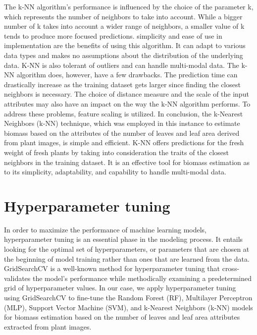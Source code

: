 \documentclass[a4paper,11pt]{report}%
\renewcommand{\\}{\vspace*{0.5\baselineskip} \newline}
\begin{document}
\noindent The k-NN algorithm's performance is influenced by the choice of the parameter k, which represents the number of neighbors to take into account. While a bigger number of k takes into account a wider range of neighbors, a smaller value of k tends to produce more focused predictions. 
simplicity and ease of use in implementation are the benefits of using this algorithm. It can adapt to various data types and makes no assumptions about the distribution of the underlying data. K-NN is also tolerant of outliers and can handle multi-modal data.
The k-NN algorithm does, however, have a few drawbacks. The prediction time can drastically increase as the training dataset gets larger since finding the closest neighbors is necessary. The choice of distance measure and the scale of the input attributes may also have an impact on the way the k-NN algorithm performs. To address these problems, feature scaling is utilized.
In conclusion, the k-Nearest Neighbors (k-NN) technique, which was employed in this instance to estimate biomass based on the attributes of the number of leaves and leaf area derived from plant images, is simple and efficient. K-NN offers predictions for the fresh weight of fresh plants by taking into consideration the traits of the closest neighbors in the training dataset. It is an effective tool for biomass estimation as to its simplicity, adaptability, and capability to handle multi-modal data. 

\section{Hyperparameter tuning}
In order to maximize the performance of machine learning models, hyperparameter tuning is an essential phase in the modeling process. It entails looking for the optimal set of hyperparameters, or parameters that are chosen at the beginning of model training rather than ones that are learned from the data. GridSearchCV is a well-known method for hyperparameter tuning that cross-validates the model's performance while methodically examining a predetermined grid of hyperparameter values.
In our case, we apply hyperparameter tuning using GridSearchCV to fine-tune the Random Forest (RF), Multilayer Perceptron (MLP), Support Vector Machine (SVM), and k-Nearest Neighbors (k-NN) models for biomass estimation based on the number of leaves and leaf area attributes extracted from plant images.
\end{document}
